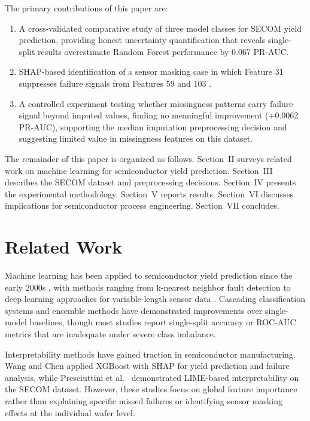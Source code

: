 \documentclass[conference]{IEEEtran}
\begin{document}
The primary contributions of this paper are:
\begin{enumerate}
\item A cross-validated comparative study of three model classes 
for SECOM yield prediction, providing honest uncertainty 
quantification that reveals single-split results overestimate 
Random Forest performance by 0.067 PR-AUC.

\item SHAP-based identification of a sensor masking case in which 
Feature 31 suppresses failure signals from Features 59 and 103
 \cite{lundberg2020local}.

\item A controlled experiment testing whether missingness patterns 
carry failure signal beyond imputed values, finding no meaningful 
improvement (+0.0062 PR-AUC), supporting the median imputation 
preprocessing decision and suggesting limited value in missingness 
features on this dataset.
\end{enumerate}

The remainder of this paper is organized as follows. Section~II 
surveys related work on machine learning for semiconductor yield 
prediction. Section~III describes the SECOM dataset and preprocessing 
decisions. Section~IV presents the experimental methodology. 
Section~V reports results. Section~VI discusses implications for 
semiconductor process engineering. Section~VII concludes.

\section{Related Work}

Machine learning has been applied to semiconductor yield 
prediction since the early 2000s \cite{shin2000machine}, 
with methods ranging from k-nearest neighbor fault detection 
\cite{he2007fault} to deep learning approaches for 
variable-length sensor data \cite{kim2019fault}. 
Cascading classification systems \cite{stich2020yield} 
and ensemble methods \cite{busch2022yield} have demonstrated 
improvements over single-model baselines, though most studies 
report single-split accuracy or ROC-AUC metrics that are 
inadequate under severe class imbalance.

Interpretability methods have gained traction in semiconductor 
manufacturing. Wang and Chen \cite{wang2024improved} applied 
XGBoost with SHAP for yield prediction and failure analysis, 
while Presciuttini et al.\ \cite{presciuttini2024advancing} 
demonstrated LIME-based interpretability on the SECOM dataset. 
However, these studies focus on global feature importance 
rather than explaining specific missed failures or identifying 
sensor masking effects at the individual wafer level.
\end{document}
